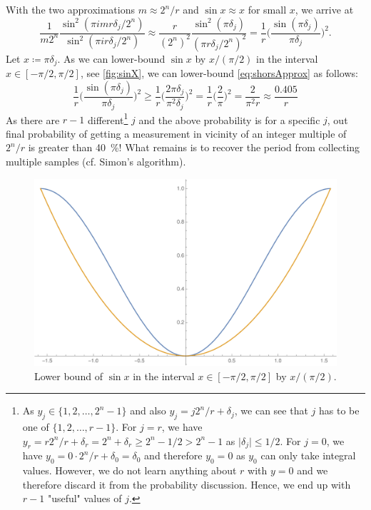 					With the two approximations \( m \approx 2^n/r \) and \( \sin x \approx x \) for small \(x\), we arrive at
					\begin{equation}
						\frac{1}{m 2^n} \frac{\sin^2(\pi i m r \delta_j / 2^n)}{\sin^2(\pi i r \delta_j / 2^n)}
							\approx \frac{r}{(2^n)^2} \frac{\sin^2(\pi \delta_j)}{(\pi r \delta_j / 2^n)^2}
							= \frac{1}{r} \Biggl( \frac{\sin(\pi \delta_j)}{\pi \delta_j} \Biggr)^2.  \label{eq:shorsApprox}
					\end{equation}
					Let \( x \coloneqq \pi \delta_j \). As we can lower-bound \( \sin x \) by \(x/(\pi/2)\) in the interval \( x \in [-\pi/2, \pi/2] \), see \autoref{fig:sinX}, we can lower-bound \eqref{eq:shorsApprox} as follows:
					\begin{equation}
						\frac{1}{r} \Biggl( \frac{\sin(\pi \delta_j)}{\pi \delta_j} \Biggr)^2
							\geq \frac{1}{r} \Biggl( \frac{2 \pi \delta_j}{\pi^2 \delta_j} \Biggr)^2
							= \frac{1}{r} \Biggl( \frac{2}{\pi} \Biggr)^2
							= \frac{2}{\pi^2 r}
							\approx \frac{\num{0.405}}{r}
					\end{equation}
					As there are \(r - 1\) different\footnote{As \( y_j \in \{ 1, 2, \dots, 2^n - 1 \} \) and also \( y_j = j 2^n/r + \delta_j \), we can see that \( j \) has to be one of \( \{ 1, 2, \dots, r - 1 \} \). For \( j = r \), we have \( y_r = r 2^n / r + \delta_r = 2^n + \delta_r \geq 2^n - 1/2 > 2^n - 1 \) as \( \lvert \delta_j \rvert \leq 1/2 \). For \( j = 0 \), we have \( y_0 = 0 \cdot 2^n / r + \delta_0 = \delta_0 \) and therefore \(y_0 = 0\) as \(y_0\) can only take integral values. However, we do not learn anything about \(r\) with \(y = 0\) and we therefore discard it from the probability discussion. Hence, we end up with \(r - 1\) "useful" values of \(j\).} \(j\) and the above probability is for a specific \(j\), out final probability of getting a measurement in vicinity of an integer multiple of \(2^n/r\) is greater than \SI{40}{\percent}! What remains is to recover the period from collecting multiple samples (cf. Simon's algorithm).

					\begin{figure}
						\centering
						\includegraphics[width=0.5\linewidth]{sin-x.pdf}
						\caption[Lower Bound of Sine]{Lower bound of \(\sin x\) in the interval \( x \in [-\pi/2, \pi/2] \) by \(x/(\pi/2)\).}
						\label{fig:sinX}
					\end{figure}

